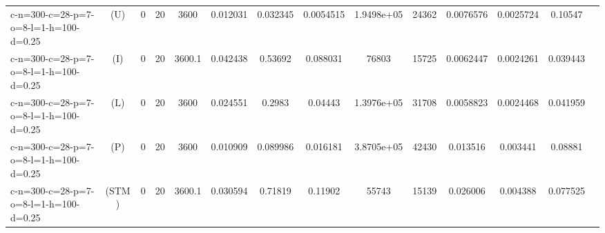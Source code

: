 \documentclass[landscape, a4paper]{article}
\newcommand{\STM}{\ensuremath{\mathrm{STM}}}
\newcommand{\Improved}{\ensuremath{\mathrm{I}}}
\newcommand{\Loose}{\ensuremath{\mathrm{L}}}
\newcommand{\Profit}{\ensuremath{\mathrm{P}}}
\newcommand{\Utility}{\ensuremath{\mathrm{U}}}
\begin{document}
\begin{center}
\begin{tabular}{lccccccccccccc}
c-n=300-c=28-p=7-o=8-l=1-h=100-d=0.25 & (\Utility) & 0 & 20 & 3600 & 0.012031 & 0.032345 & 0.0054515 & 1.9498e+05 & 24362 & 0.0076576 & 0.0025724 & 0.10547 & \\
c-n=300-c=28-p=7-o=8-l=1-h=100-d=0.25 & (\Improved) & 0 & 20 & 3600.1 & 0.042438 & 0.53692 & 0.088031 & 76803 & 15725 & 0.0062447 & 0.0024261 & 0.039443 & \\
c-n=300-c=28-p=7-o=8-l=1-h=100-d=0.25 & (\Loose) & 0 & 20 & 3600 & 0.024551 & 0.2983 & 0.04443 & 1.3976e+05 & 31708 & 0.0058823 & 0.0024468 & 0.041959 & \\
c-n=300-c=28-p=7-o=8-l=1-h=100-d=0.25 & (\Profit) & 0 & 20 & 3600 & 0.010909 & 0.089986 & 0.016181 & 3.8705e+05 & 42430 & 0.013516 & 0.003441 & 0.08881 & \\
c-n=300-c=28-p=7-o=8-l=1-h=100-d=0.25 & (\STM) & 0 & 20 & 3600.1 & 0.030594 & 0.71819 & 0.11902 & 55743 & 15139 & 0.026006 & 0.004388 & 0.077525 & \\
\end{tabular}
\end{center}
\end{document}
